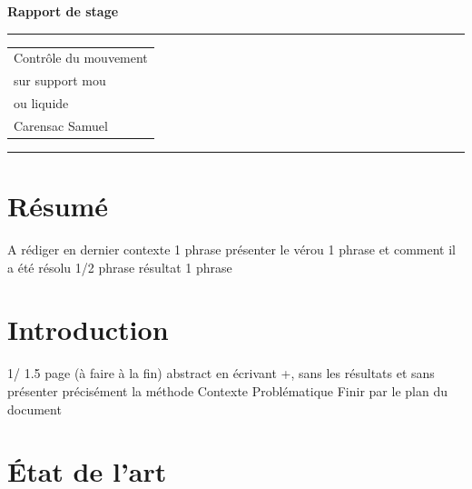\documentclass{llncs}
\begin{document}
\thispagestyle{empty}
\begin{flushleft}
\LARGE\bfseries Rapport de stage\\[2cm]
\end{flushleft}
\rule{\textwidth}{1pt}
\vspace{2pt}
\begin{flushright}
\Huge
\begin{tabular}{@{}l}
Contrôle du mouvement\\
sur support mou\\
ou liquide\\[6pt]
{\Large Carensac Samuel}
\end{tabular}
\end{flushright}
\rule{\textwidth}{1pt}
\vfill
%
\newpage
\tableofcontents
\newpage
%
\section{Résumé}
%
A rédiger en dernier
contexte 1 phrase
présenter le vérou 1 phrase
et comment il a été résolu 1/2 phrase
résultat 1 phrase
%
\section{Introduction}
%
1/ 1.5 page (à faire à la fin) abstract en écrivant +, sans les résultats et sans présenter précisément la méthode
Contexte
Problématique
Finir par le plan du document


%
\section{État de l'art}
%
\end{document}
